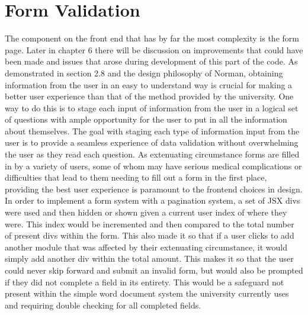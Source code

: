\section{Form Validation}

The component on the front end that has by far the most complexity is the form page. Later in chapter 6 there will be discussion on improvements that could have been made and issues that arose during development of this part of the code. As demonstrated in section 2.8 and the design philosophy of Norman, obtaining information from the user in an easy to understand way is crucial for making a better user experience than that of the method provided by the university. One way to do this is to stage each input of information from the user in a logical set of questions with ample opportunity for the user to put in all the information about themselves.
\newline
\newline
The goal with staging each type of information input from the user is to provide a seamless experience of data validation without overwhelming the user as they read each question. As extenuating circumstance forms are filled in by a variety of users, some of whom may have serious medical complications or difficulties that lead to them needing to fill out a form in the first place, providing the best user experience is paramount to the frontend choices in design.
\newline
\newline
In order to implement a form system with a pagination system, a set of JSX divs were used and then hidden or shown given a current user index of where they were. This index would be incremented and then compared to the total number of present divs within the form. This also made it so that if a user clicks to add another module that was affected by their extenuating circumstance, it would simply add another div within the total amount. This makes it so that the user could never skip forward and submit an invalid form, but would also be prompted if they did not complete a field in its entirety. This would be a safeguard not present within the simple word document system the university currently uses and requiring double checking for all completed fields. 
